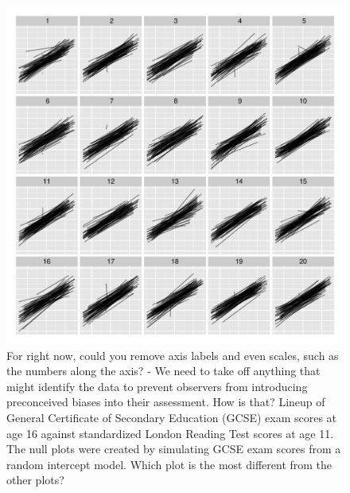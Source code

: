 \documentclass{article} %
\newcommand{\hh}[1]{{\color{orange} #1}}
\newcommand{\al}[1]{{\color{red} #1}}
\begin{document}
\begin{figure}
	\centering
	\includegraphics[width=\textwidth]{normexam_fanned_lineup13.pdf}
	\caption{\label{fig:fanned} \hh{For right now, could you remove axis labels and even scales, such as the numbers along the axis? - We need to take off anything that might identify the data to prevent observers from introducing preconceived biases into their assessment. } \al{How is that?} Lineup of General Certificate of Secondary Education (GCSE) exam scores at age 16 against standardized London Reading Test scores at age 11. The null plots were created by simulating GCSE exam scores from a random intercept model. 
\hh{Which plot is the most different from the other plots?}
	}
\end{figure}



\end{document}
